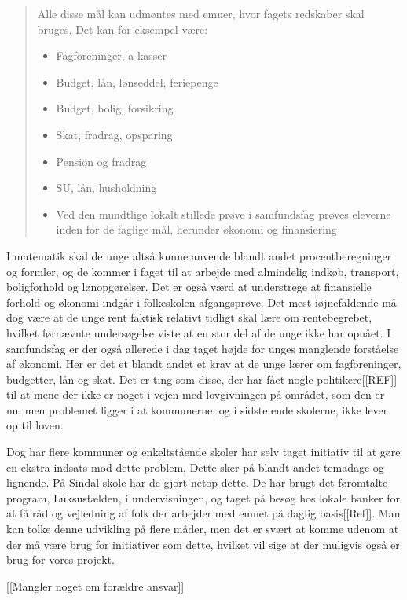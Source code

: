 \begin{quotation}
\begin{description}
\item{Alle disse mål kan udmøntes med emner, hvor fagets redskaber skal bruges. Det kan for eksempel være:}
\noindent \begin{itemize}
\item{Fagforeninger, a-kasser}
\item{Budget, lån, lønseddel, feriepenge}
\item{Budget, bolig, forsikring}
\item{Skat, fradrag, opsparing}
\item{Pension og fradrag}
\item{SU, lån, husholdning}
\item{Ved den mundtlige lokalt stillede prøve i samfundsfag prøves eleverne inden for de faglige mål, herunder økonomi og finansiering}
\end{itemize}
\end{description}
\end{quotation}

I matematik skal de unge altså kunne anvende blandt andet procentberegninger og formler, og de kommer i faget til at arbejde med almindelig indkøb, transport, boligforhold og lønopgørelser. Det er også værd at understrege at finansielle forhold og økonomi indgår i folkeskolen afgangsprøve. Det mest iøjnefaldende må dog være at de unge rent faktisk relativt tidligt skal lære om rentebegrebet, hvilket førnævnte undersøgelse viste at en stor del af de unge ikke har opnået. I samfundsfag er der også allerede i dag taget højde for unges manglende forståelse af økonomi. Her er det et blandt andet et krav at de unge lærer om fagforeninger, budgetter, lån og skat. Det er ting som disse, der har fået nogle politikere[[REF]] til at mene der ikke er noget i vejen med lovgivningen på området, som den er nu, men problemet ligger i at kommunerne, og i sidste ende skolerne, ikke lever op til loven.

Dog har flere kommuner og enkeltstående skoler har selv taget initiativ til at gøre en ekstra indsats mod dette problem, Dette sker på blandt andet temadage og lignende. På Sindal-skole har de gjort netop dette. De har brugt det føromtalte program, Luksusfælden, i undervisningen, og taget på besøg hos lokale banker for at få råd og vejledning af folk der arbejder med emnet på daglig basis[[Ref]]. Man kan tolke denne udvikling på flere måder, men det er svært at komme udenom at der må være brug for initiativer som dette, hvilket vil sige at der muligvis også er brug for vores projekt.

[[Mangler noget om forældre ansvar]]




 